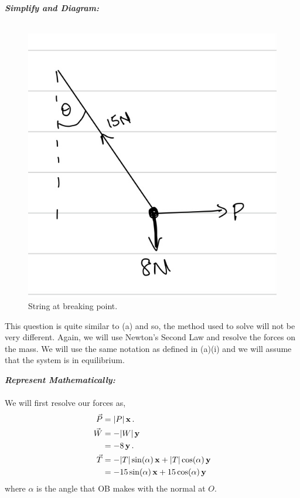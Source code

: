 \begin{subquestions}

\subquestion

\begin{subsubquestions}
	
\subsubquestion

\textbf{\textit{Simplify and Diagram:}} \\ \\
\begin{figure}[H]
	\begin{center}
		\includegraphics[scale=0.25]{../2010/figures/2010q6-2}
		\caption{\label{2010:q6:Diagram2} String at breaking point.}
	\end{center}
\end{figure}
This question is quite similar to (a) and so, the method used to solve will not be very different. Again, we will use Newton's Second Law and resolve the forces on the mass. We will use the same notation as defined in (a)(i) and we will assume that the system is in equilibrium.





\textbf{\textit{Represent Mathematically:}} \\ \\ 
We will first resolve our forces as,
\begin{align}
	\vec{P} & = |P|\,\mathbf{x} \,. \\ 
	\vec{W} & = -|W|\,\mathbf{y} \nonumber \\
			& = -8\,\mathbf{y} \,. \\ 
	\vec{T} & = -|T|\sin(\alpha)\,\mathbf{x} + |T|\cos(\alpha)\,\mathbf{y} \nonumber \\
	        & = -15\sin(\alpha)\,\mathbf{x} + 15\cos(\alpha)\,\mathbf{y}
\end{align}
where $\alpha$ is the angle that OB makes with the normal at $O$.
	

\end{subsubquestions}
\end{subquestions}
